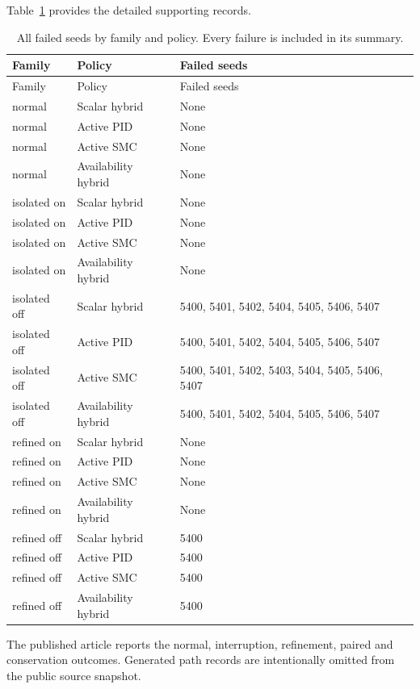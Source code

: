 \documentclass[11pt,a4paper]{article}
\begin{document}
\begingroup\hypersetup{hypertexnames=true}\small\setlength{\tabcolsep}{4pt}
Table~\ref{supp:longtable:11} provides the detailed supporting records.
\begin{longtable}{lp{.28\linewidth}p{.40\linewidth}}
\caption{All failed seeds by family and policy. Every failure is included in its summary.}\label{supp:longtable:11}\\\toprule
Family & Policy & Failed seeds\\\midrule\endfirsthead
\toprule
Family & Policy & Failed seeds\\\midrule\endhead
normal & Scalar hybrid & None\\
normal & Active PID & None\\
normal & Active SMC & None\\
normal & Availability hybrid & None\\
isolated on & Scalar hybrid & None\\
isolated on & Active PID & None\\
isolated on & Active SMC & None\\
isolated on & Availability hybrid & None\\
isolated off & Scalar hybrid & 5400, 5401, 5402, 5404, 5405, 5406, 5407\\
isolated off & Active PID & 5400, 5401, 5402, 5404, 5405, 5406, 5407\\
isolated off & Active SMC & 5400, 5401, 5402, 5403, 5404, 5405, 5406, 5407\\
isolated off & Availability hybrid & 5400, 5401, 5402, 5404, 5405, 5406, 5407\\
refined on & Scalar hybrid & None\\
refined on & Active PID & None\\
refined on & Active SMC & None\\
refined on & Availability hybrid & None\\
refined off & Scalar hybrid & 5400\\
refined off & Active PID & 5400\\
refined off & Active SMC & 5400\\
refined off & Availability hybrid & 5400\\
\bottomrule\end{longtable}\endgroup

The published article reports the normal, interruption, refinement, paired and conservation outcomes. Generated path records are intentionally omitted from the public source snapshot.
\end{document}
